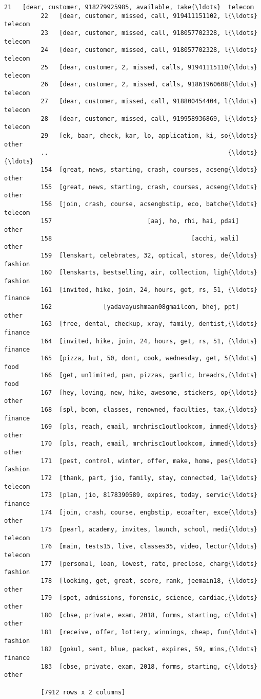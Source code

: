 \documentclass[11pt]{article}
\begin{document}
\begin{Verbatim}[commandchars=\\\{\}]
          21   [dear, customer, 918279925985, available, take{\ldots}  telecom
          22   [dear, customer, missed, call, 919411151102, l{\ldots}  telecom
          23   [dear, customer, missed, call, 918057702328, l{\ldots}  telecom
          24   [dear, customer, missed, call, 918057702328, l{\ldots}  telecom
          25   [dear, customer, 2, missed, calls, 91941115110{\ldots}  telecom
          26   [dear, customer, 2, missed, calls, 91861960608{\ldots}  telecom
          27   [dear, customer, missed, call, 918800454404, l{\ldots}  telecom
          28   [dear, customer, missed, call, 919958936869, l{\ldots}  telecom
          29   [ek, baar, check, kar, lo, application, ki, so{\ldots}    other
          ..                                                 {\ldots}      {\ldots}
          154  [great, news, starting, crash, courses, acseng{\ldots}    other
          155  [great, news, starting, crash, courses, acseng{\ldots}    other
          156  [join, crash, course, acsengbstip, eco, batche{\ldots}  telecom
          157                          [aaj, ho, rhi, hai, pdai]    other
          158                                      [acchi, wali]    other
          159  [lenskart, celebrates, 32, optical, stores, de{\ldots}  fashion
          160  [lenskarts, bestselling, air, collection, ligh{\ldots}  fashion
          161  [invited, hike, join, 24, hours, get, rs, 51, {\ldots}  finance
          162              [yadavayushmaan08gmailcom, bhej, ppt]    other
          163  [free, dental, checkup, xray, family, dentist,{\ldots}  finance
          164  [invited, hike, join, 24, hours, get, rs, 51, {\ldots}  finance
          165  [pizza, hut, 50, dont, cook, wednesday, get, 5{\ldots}     food
          166  [get, unlimited, pan, pizzas, garlic, breadrs,{\ldots}     food
          167  [hey, loving, new, hike, awesome, stickers, op{\ldots}    other
          168  [spl, bcom, classes, renowned, faculties, tax,{\ldots}  finance
          169  [pls, reach, email, mrchrisc1outlookcom, immed{\ldots}    other
          170  [pls, reach, email, mrchrisc1outlookcom, immed{\ldots}    other
          171  [pest, control, winter, offer, make, home, pes{\ldots}  fashion
          172  [thank, part, jio, family, stay, connected, la{\ldots}  telecom
          173  [plan, jio, 8178390589, expires, today, servic{\ldots}  finance
          174  [join, crash, course, engbstip, ecoafter, exce{\ldots}    other
          175  [pearl, academy, invites, launch, school, medi{\ldots}  telecom
          176  [main, tests15, live, classes35, video, lectur{\ldots}  telecom
          177  [personal, loan, lowest, rate, preclose, charg{\ldots}  fashion
          178  [looking, get, great, score, rank, jeemain18, {\ldots}    other
          179  [spot, admissions, forensic, science, cardiac,{\ldots}    other
          180  [cbse, private, exam, 2018, forms, starting, c{\ldots}    other
          181  [receive, offer, lottery, winnings, cheap, fun{\ldots}  fashion
          182  [gokul, sent, blue, packet, expires, 59, mins,{\ldots}  finance
          183  [cbse, private, exam, 2018, forms, starting, c{\ldots}    other
          
          [7912 rows x 2 columns]
\end{Verbatim}
            
\end{document}
